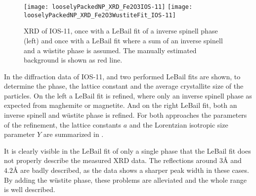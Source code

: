 \documentclass[\main/dresen_thesis.tex]{subfiles}
\begin{document}
  \label{sec:looselyPackedNS:nanoparticle:xrd}
  \begin{figure}[tb]
    \centering
    \texttt{[image: looselyPackedNP\_XRD\_Fe2O3IOS-11]}
    \texttt{[image: looselyPackedNP\_XRD\_Fe2O3WustiteFit\_IOS-11]}
    \caption{\label{fig:monolayers:nanoparticle:xrd}XRD of IOS-11, once with a LeBail fit of a inverse spinell phase (left) and once with a LeBail fit where a sum of an inverse spinell and a w\"ustite phase is assumed. The manually estimated background is shown as red line.}
  \end{figure}

  In  the diffraction data of IOS-11, and two performed LeBail fits are shown, to determine the phase, the lattice constant and the average crystallite size of the particles.
  On the left a LeBail fit is refined, where only an inverse spinell phase as expected from maghemite or magnetite.
  And on the right LeBail fit, both an inverse spinell and w\"ustite phase is refined.
  For both approaches the parameters of the refinement, the lattice constants $a$ and the Lorentzian isotropic size parameter $Y$ are summarized in .

  It is clearly visible in the LeBail fit of only a single phase that the LeBail fit does not properly describe the measured XRD data.
  The reflections around $3 \unit{\angstrom}$ and $4.2 \unit{\angstrom}$ are badly described, as the data shows a sharper peak width in these cases.
  By adding the w\"ustite phase, these problems are alleviated and the whole range is well described.
\end{document}
